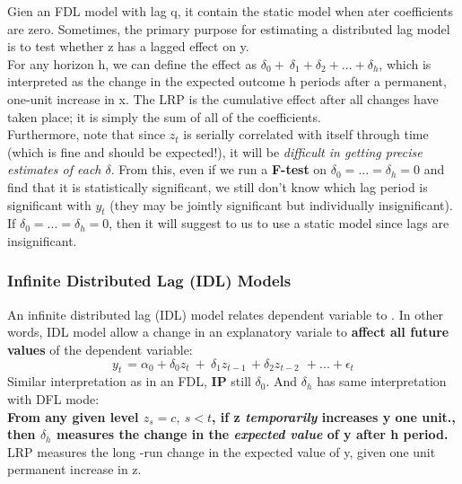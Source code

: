 \documentclass[12pt]{article}
\begin{document}
Gien an FDL model with lag q, it contain the static model when ater coefficients are zero. Sometimes, the primary purpose for estimating a distributed lag model is to test whether z has a lagged effect on y.
\\

For any horizon h, we can define the \textcumulative effect as $\delta_0 +\ \delta_1+\delta_2 +...+\delta_h $, which is interpreted as the change in the expected outcome h periods after a permanent, one-unit increase in x. The LRP is the cumulative effect after all changes have taken place; it is simply the sum of all of the coefficients. 
\\

\noindent
Furthermore, note that since $z_t$ is serially correlated with itself through time (which is fine and should be expected!), it will be \textit{difficult in getting precise estimates of each $\delta$}. From this, even if we run a \textbf{F-test} on $\delta_0 = ...= \delta_h = 0$ and find that it is statistically significant, we still don’t know which lag period is significant with $y_t$ (they may be jointly significant but individually insignificant). If $\delta_0 = ...= \delta_h = 0$, then it will suggest to us to use a static model since lags are insignificant. 
\\



{\color{RoyalBlue}
\subsubsection{Infinite Distributed Lag (IDL) Models}}
An infinite distributed lag (IDL) model relates dependent variable to . In other words, IDL model allow a change in an explanatory variale to \textbf{affect all future values} of the dependent variable:
\begin{equation}
y_{t\ }=\alpha_0+\delta_0z_t\ +\ \delta_1z_{t-1\ }+\delta_2z_{t-2\ }\ +...+\epsilon_t
\end{equation}
Similar interpretation as in an FDL, \textbf{IP} still $\delta_0$. 
And $\delta_h$ has same interpretation with DFL mode: \\
\textbf{From any given level $z_s = c,\ s < t$, if z \textit{temporarily} increases y one unit., then $\delta_h$ measures the change in the \textit{expected value} of y after h period.} LRP measures the long -run change in the expected value of y, given one unit permanent increase in z.  
\\
\end{document}
